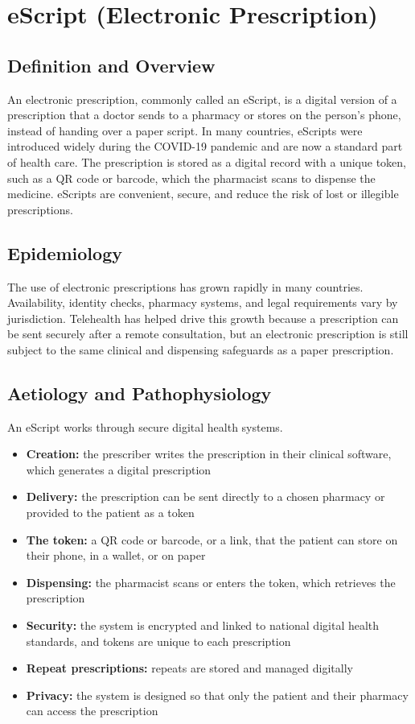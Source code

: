 \chapter{eScript (Electronic Prescription)}

\section*{Definition and Overview}
An electronic prescription, commonly called an eScript, is a digital version of a prescription that a doctor sends to a pharmacy or stores on the person's phone, instead of handing over a paper script. In many countries, eScripts were introduced widely during the COVID-19 pandemic and are now a standard part of health care. The prescription is stored as a digital record with a unique token, such as a QR code or barcode, which the pharmacist scans to dispense the medicine. eScripts are convenient, secure, and reduce the risk of lost or illegible prescriptions.

\section*{Epidemiology}
The use of electronic prescriptions has grown rapidly in many countries. Availability, identity checks, pharmacy systems, and legal requirements vary by jurisdiction. Telehealth has helped drive this growth because a prescription can be sent securely after a remote consultation, but an electronic prescription is still subject to the same clinical and dispensing safeguards as a paper prescription.

\section*{Aetiology and Pathophysiology}
An eScript works through secure digital health systems.
\begin{itemize}
    \item \textbf{Creation:} the prescriber writes the prescription in their clinical software, which generates a digital prescription
    \item \textbf{Delivery:} the prescription can be sent directly to a chosen pharmacy or provided to the patient as a token
    \item \textbf{The token:} a QR code or barcode, or a link, that the patient can store on their phone, in a wallet, or on paper
    \item \textbf{Dispensing:} the pharmacist scans or enters the token, which retrieves the prescription
    \item \textbf{Security:} the system is encrypted and linked to national digital health standards, and tokens are unique to each prescription
    \item \textbf{Repeat prescriptions:} repeats are stored and managed digitally
    \item \textbf{Privacy:} the system is designed so that only the patient and their pharmacy can access the prescription
\end{itemize}

